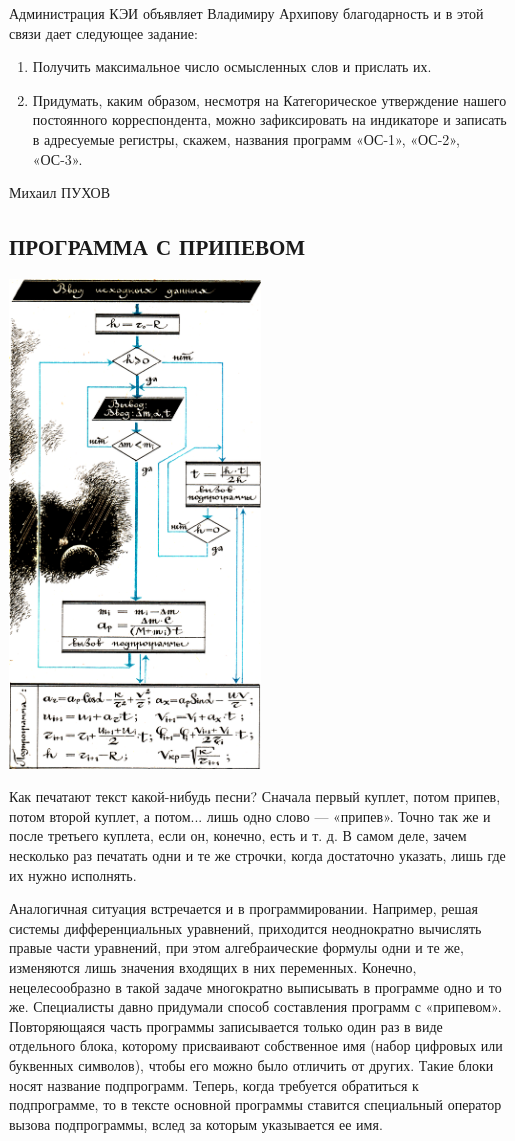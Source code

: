 \documentclass[11pt,a4paper,oneside]{article}
\begin{document}
Администрация КЭИ объявляет Владимиру Архипову благодарность и в этой связи дает следующее задание:
\begin{enumerate}
\item Получить максимальное число осмысленных слов и прислать их.
\item Придумать, каким образом, несмотря на Категорическое утверждение нашего постоянного корреспондента, можно зафиксировать на индикаторе и записать в адресуемые регистры, скажем, названия программ «ОС-1», «ОС-2», «ОС-3».
\end{enumerate}

Михаил ПУХОВ

\subsection{ПРОГРАММА С ПРИПЕВОМ}
\includegraphics[width=0.5\textwidth]{subprg}

Как печатают текст какой-нибудь песни? Сначала первый куплет, потом припев, потом второй куплет, а потом... лишь одно слово — «припев». Точно так же и после третьего куплета, если он, конечно, есть и т. д. В самом деле, зачем несколько раз печатать одни и те же строчки, когда достаточно указать, лишь где их нужно исполнять.

Аналогичная ситуация встречается и в программировании. Например, решая системы дифференциальных уравнений, приходится неоднократно вычислять правые части уравнений, при этом алгебраические формулы одни и те же, изменяются лишь значения входящих в них переменных. Конечно, нецелесообразно в такой задаче многократно выписывать в программе одно и то же. Специалисты давно придумали способ составления программ с «припевом». Повторяющаяся часть программы записывается только один раз в виде отдельного блока, которому присваивают собственное имя (набор цифровых или буквенных символов), чтобы его можно было отличить от других. Такие блоки носят название подпрограмм. Теперь, когда требуется обратиться к подпрограмме, то в тексте основной программы ставится специальный оператор вызова подпрограммы, вслед за которым указывается ее имя.
\end{document}
